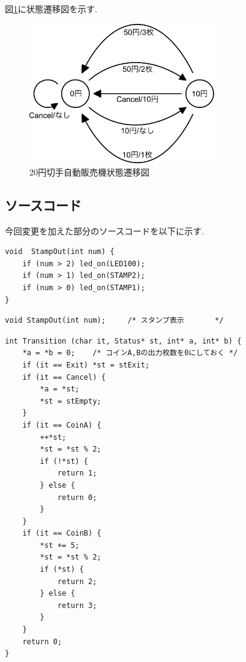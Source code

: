 \documentclass[titlepage]{jsarticle}
\begin{document}
    図\ref{fig:本番状態遷移図}に状態遷移図を示す.

    \begin{figure}[ht]
        \centering
        \includegraphics[width=8cm]{images/honban.pdf}
        \caption{20円切手自動販売機状態遷移図}
        \label{fig:本番状態遷移図}
    \end{figure}

    \subsection{ソースコード}
        今回変更を加えた部分のソースコードを以下に示す. \\

        \begin{lstlisting}[caption=piclib.c, label=piclib]
void  StampOut(int num) {
    if (num > 2) led_on(LED100);
    if (num > 1) led_on(STAMP2);
    if (num > 0) led_on(STAMP1);
}
        \end{lstlisting}

        \begin{lstlisting}[caption=piclib.h extern.h]
void StampOut(int num);		/* スタンプ表示		*/
        \end{lstlisting}

        \begin{lstlisting}[caption=stamp.c 遷移関数, label=transition]
int Transition (char it, Status* st, int* a, int* b) {
    *a = *b = 0;	/* コインA,Bの出力枚数を0にしておく */
    if (it == Exit) *st = stExit;
    if (it == Cancel) {
        *a = *st;
        *st = stEmpty;
    }
    if (it == CoinA) {
        ++*st;
        *st = *st % 2;
        if (!*st) {
            return 1;
        } else {
            return 0;
        }
    }
    if (it == CoinB) {
        *st += 5;
        *st = *st % 2;
        if (*st) {
            return 2;
        } else {
            return 3;
        }
    }
    return 0;
}
        \end{lstlisting}
\end{document}
